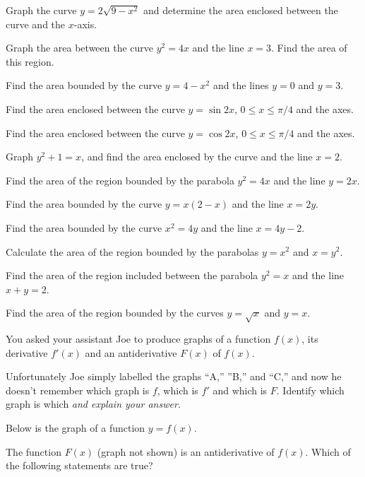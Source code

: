 \begin{multicols}{2}
\problem Graph the curve $y=2\sqrt{9-x^2}$ and determine the area enclosed %
between the curve and the $x$-axis.

\problem Graph the area between the curve $y^2=4x$ and the line $x=3$.  Find the %
area of this region.

\problem Find the area bounded by the curve $y=4-x^2$ and the lines $y=0$ and %
$y=3$.

\problem Find the area enclosed between the curve $y=\sin 2x$, $0\le x\le \pi/4$ %
and the axes.

\problem Find the area enclosed between the curve $y=\cos 2x$, $0\le x\le \pi/4$ %
and the axes.

\problem Graph $y^2+1=x$, and find the area enclosed by the curve and the line %
$x=2$.

\problem Find the area of the region bounded by the parabola $y^2=4x$ and the %
line $y=2x$.

\problem Find the area bounded by the curve $y=x(2-x)$ and the line $x=2y$. %

\problem Find the area bounded by the curve $x^2=4y$ and the line $x=4y-2$. %

\problem Calculate the area of the region bounded by the parabolas $y=x^2$ and %
$x=y^2$.

\problem Find the area of the region included between the parabola $y^2=x$ and %
the line $x+y=2$.

\problem Find the area of the region bounded by the curves $y=\sqrt{x}$ and %
$y=x$.

\problem \groupproblem You asked your assistant Joe to produce graphs of a function $f(x)$, %
its derivative $f'(x)$ and an antiderivative $F(x)$ of $f(x)$.

Unfortunately Joe simply labelled the graphs ``A,'' ''B,'' and ``C,''
and now he doesn't remember which graph is $f$, which is $f'$ and which
is $F$.  Identify which graph is which \emph{and explain your answer.}
\begin{center}
  
\end{center}

\problem \groupproblem Below is the graph of a function $y=f(x)$. %
\begin{center}
  
\end{center}
The function $F(x)$ (graph not shown) is an antiderivative of $f(x)$.
Which of the following statements are true?


\end{multicols}

